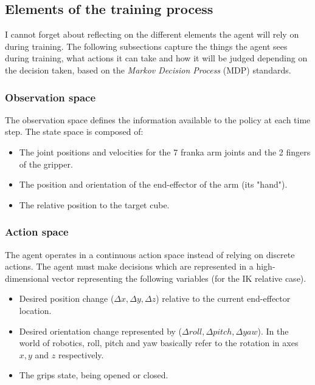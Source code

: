 \subsection{Elements of the training process}
I cannot forget about reflecting on the different elements the agent will rely on during training. The following subsections capture the things the agent sees during training, what actions it can take and how it will be judged depending on the decision taken, based on the \textit{Markov Decision Process} (MDP) standards.

\subsubsection{Observation space}
The observation space defines the information available to the policy at each time step. The state space  is composed of:

\begin{itemize}
	\item The joint positions and velocities for the 7 franka arm joints and the 2 fingers of the gripper. 
	
	\item The position and orientation of the end-effector of the arm (its "hand").
	
	\item The relative position to the target cube.
\end{itemize}

\subsubsection{Action space}
The agent operates in a continuous action space instead of relying on discrete actions. The agent must make decisions which are represented in a high-dimensional vector representing the following variables (for the IK relative case).

\begin{itemize}
	\item Desired position change ($\Delta x, \Delta y, \Delta z$) relative to the current end-effector location.
	
	\item Desired orientation change represented by ($\Delta roll, \Delta pitch, \Delta yaw$). In the world of robotics, roll, pitch and yaw basically refer to the rotation in axes $x, y$ and $z$ respectively.
	
	\item The grips state, being opened or closed. 
\end{itemize}

